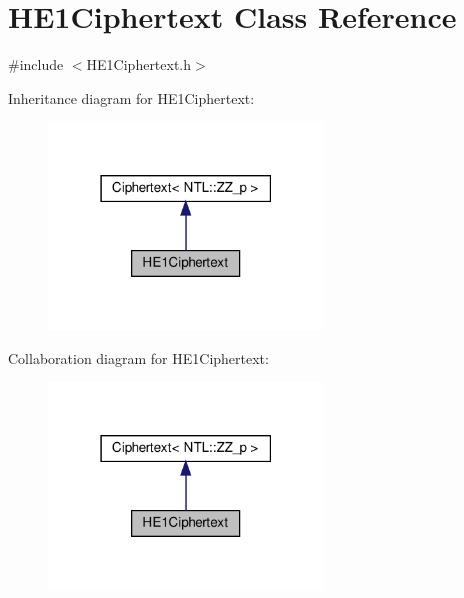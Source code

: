 \hypertarget{classHE1Ciphertext}{}\section{H\+E1\+Ciphertext Class Reference}
\label{classHE1Ciphertext}


{\ttfamily \#include $<$H\+E1\+Ciphertext.\+h$>$}



Inheritance diagram for H\+E1\+Ciphertext\+:
\nopagebreak
\begin{figure}[H]
\begin{center}
\leavevmode
\includegraphics[width=207pt]{classHE1Ciphertext__inherit__graph}
\end{center}
\end{figure}


Collaboration diagram for H\+E1\+Ciphertext\+:
\nopagebreak
\begin{figure}[H]
\begin{center}
\leavevmode
\includegraphics[width=207pt]{classHE1Ciphertext__coll__graph}
\end{center}
\end{figure}
